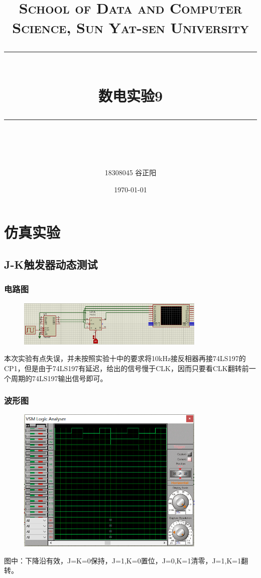 \documentclass[UTF8, a4paper, 11pt]{article}
\title{	
\normalfont \normalsize
\textsc{School of Data and Computer Science, Sun Yat-sen University} \\ [25pt] %
\rule{\textwidth}{0.5pt} \\[0.4cm] %
\huge 数电实验9\\ %
\rule{\textwidth}{2pt} \\[0.5cm] %
\author{18308045 谷正阳}
\date{\normalsize\today}
}
\begin{document}
\maketitle
\tableofcontents
\newpage
\section{仿真实验}
\subsection{J-K触发器动态测试}
\subsubsection{电路图}
\begin{figure}[H]
    \centering
    \includegraphics[width=0.8\textwidth]{ex9.1电路图.png}
\end{figure}
本次实验有点失误，并未按照实验十中的要求将10kHz接反相器再接74LS197的CP1，但是由于74LS197有延迟，给出的信号慢于CLK，因而只要看CLK翻转前一个周期的74LS197输出信号即可。
\subsubsection{波形图}
\begin{figure}[H]
    \centering
    \includegraphics[width=0.8\textwidth]{ex9.1波形图.png}
\end{figure}
图中：下降沿有效，J=K=0保持，J=1,K=0置位，J=0,K=1清零，J=1,K=1翻转。
\end{document}

